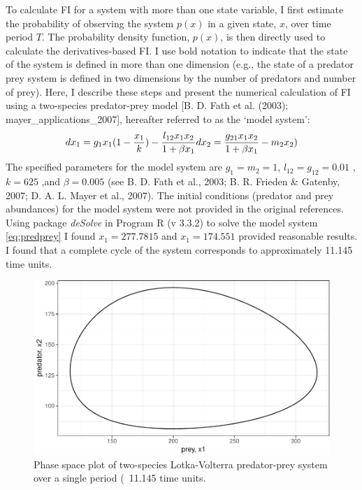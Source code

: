 \documentclass[12pt,twoside,openany]{reedthesis}
\begin{document}
To calculate FI for a system with more than one state variable, I first
estimate the probability of observing the system \(p(x)\) in a given
state, \(x\), over time period \(T\). The probability density function,
\(p(x)\), is then directly used to calculate the derivatives-based FI. I
use bold notation to indicate that the state of the system is defined in
more than one dimension (e.g., the state of a predator prey system is
defined in two dimensions by the number of predators and number of
prey). Here, I describe these steps and present the numerical
calculation of FI using a two-species predator-prey model {[}B. D. Fath
et al. (2003); mayer\_applications\_2007{]}, hereafter referred to as
the `model system':
\begin{equation} 
  dx_1 = g_{1}x_{1}(1-\frac{x_1}{k})- \frac{l_{12} x_{1} x_{2}}{1+\beta x_{1}} \\
  dx_2 = \frac{g_{21}x_1 x_2}{1+\beta x_1} - m_2 x_2)
  \label{eq:predprey}
\end{equation}
The specified parameters for the model system are \(g_1=m_2=1\),
\(l_12=g_12 = 0.01\) , \(k=625\) ,and \(\beta=0.005\) (see B. D. Fath et
al., 2003; B. R. Frieden \& Gatenby, 2007; D. A. L. Mayer et al., 2007).
The initial conditions (predator and prey abundances) for the model
system were not provided in the original references. Using package
\emph{deSolve} in Program R (v 3.3.2) to solve the model system
\eqref{eq:predprey} I found \(x_1 = 277.7815\) and \(x_1= 174.551\)
provided reasonable results. I found that a complete cycle of the system
corresponds to approximately 11.145 time units.
\begin{figure}

{\centering \includegraphics[width=0.85\linewidth]{_myDissertation_files/figure-latex/pp1Period-1} 

}

\caption{Phase space plot of two-species Lotka-Volterra predator-prey system over a single period (~11.145 time units.}\label{fig:pp1Period}
\end{figure}
\end{document}
